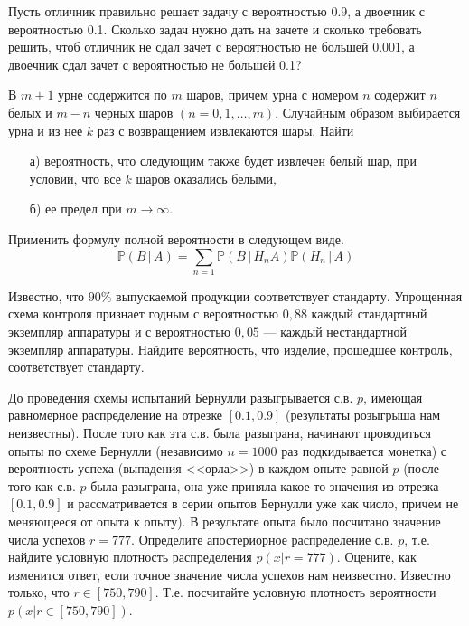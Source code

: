 \begin{problem}
Пусть отличник правильно решает задачу с вероятностью 0.9, а двоечник с вероятностью 0.1. Сколько задач нужно дать на зачете и сколько требовать решить, чтоб отличник не сдал зачет с вероятностью не большей 0.001, а двоечник сдал зачет с вероятностью не большей 0.1?
\end{problem}

\begin{problem}
В $m+1$ урне содержится по $m$ шаров, причем урна с номером $n$ содержит $n$ белых и $m-n$ черных шаров $(n = 0,1,\ldots,m)$. 
Случайным образом выбирается урна и из нее $k$ раз с возвращением извлекаются шары. Найти 
\begin{enumerate}
\item[а)] вероятность, что следующим также будет извлечен белый шар, при условии, что все $k$ шаров оказались белыми, 
\item[б)] ее предел при $m\to\infty$. 
\end{enumerate}
\end{problem}

\begin{ordre}
Применить формулу полной вероятности в следующем виде. 
$$
{\mathbb P}(B\, |\, A)=\sum\limits_{n=1} {\mathbb P}(B\, |\, H_n A){\mathbb P}(H_n\, |\, A)
$$
\end{ordre}

\begin{problem}
Известно, что $90\%$ выпускаемой продукции соответствует стандарту. Упрощенная схема контроля признает 
годным с вероятностью $0,88$ каждый стандартный экземпляр аппаратуры и с вероятностью $0,05$ --- 
каждый нестандартной экземпляр аппаратуры. Найдите вероятность, что изделие, прошедшее контроль, соответствует стандарту. 
\end{problem}


\begin{problem}
До проведения схемы испытаний Бернулли разыгрывается с.в. $p$, имеющая равномерное распределение на отрезке $[0.1, 0.9]$ 
(результаты розыгрыша нам неизвестны). После того как эта с.в. была разыграна, начинают проводиться опыты по схеме Бернулли 
(независимо $n=1000$ раз подкидывается монетка) с вероятность успеха (выпадения <<орла>>) в каждом опыте равной $p$ 
(после того как с.в. $p$ была разыграна, она уже приняла какое-то значения из отрезка $[0.1, 0.9]$ и рассматривается в серии опытов 
Бернулли уже как число, причем не меняющееся от опыта к опыту). В результате опыта было посчитано значение числа успехов $r=777$. 
Определите апостериорное распределение с.в. $p$, т.е. найдите условную плотность распределения $p(x|r=777)$. Оцените, как изменится 
ответ, если точное значение числа успехов нам неизвестно. Известно только, что $r\in[750, 790]$. Т.е. посчитайте условную 
плотность вероятности $p(x|r\in[750, 790])$. 
\end{problem}

